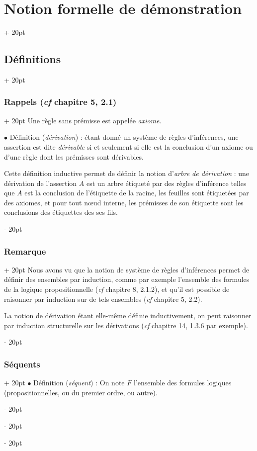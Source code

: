 \documentclass[a4paper, 12pt, twoside]{article}
\newcommand{\ind}[1][20pt]{\advance\leftskip + #1}
\newcommand{\deind}[1][20pt]{\advance\leftskip - #1}
\newenvironment{indt}[2][20pt]{#2 \par \ind[#1]}{\par \deind} %
\begin{document}
\begin{indt}{\section{Notion formelle de démonstration}}
\begin{indt}{\subsection{Définitions}}
\begin{indt}{\subsubsection{Rappels (\textit{cf} chapitre 5, 2.1)}}
                Une règle sans prémisse est appelée \emph{axiome}.

                \vspace{12pt}
                
                $\bullet$ Définition (\emph{dérivation}) : étant donné un système de règles d'inférences, une assertion est dite \emph{dérivable} si et seulement si elle est la conclusion d'un axiome ou d'une règle dont les prémisses sont dérivables.

                Cette définition inductive permet de définir la notion d'\emph{arbre de dérivation} : une dérivation de l'assertion $A$ est un arbre étiqueté par des règles d'inférence telles que $A$ est la conclusion de l'étiquette de la racine, les feuilles sont étiquetées par des axiomes, et pour tout n\oe ud interne, les prémisses de son étiquette sont les conclusions des étiquettes des ses fils.
            \end{indt}

            \vspace{12pt}
            
            \begin{indt}{\subsubsection{Remarque}}
                Nous avons vu que la notion de système de règles d'inférences permet de définir des ensembles par induction, comme par exemple l'ensemble des formules de la logique propositionnelle (\textit{cf} chapitre 8, 2.1.2), et qu'il est possible de raisonner par induction sur de tels ensembles (\textit{cf} chapitre 5, 2.2).

                La notion de dérivation étant elle-même définie inductivement, on peut raisonner par induction structurelle sur les dérivations (\textit{cf} chapitre 14, 1.3.6 par exemple).
            \end{indt}

            \vspace{12pt}
            
            \begin{indt}{\subsubsection{Séquents}}
                $\bullet$ Définition (\emph{séquent}) : On note $F$ l'ensemble des formules logiques (propositionnelles, ou du premier ordre, ou autre).


\end{indt}
\end{indt}
\end{indt}
\end{document}
